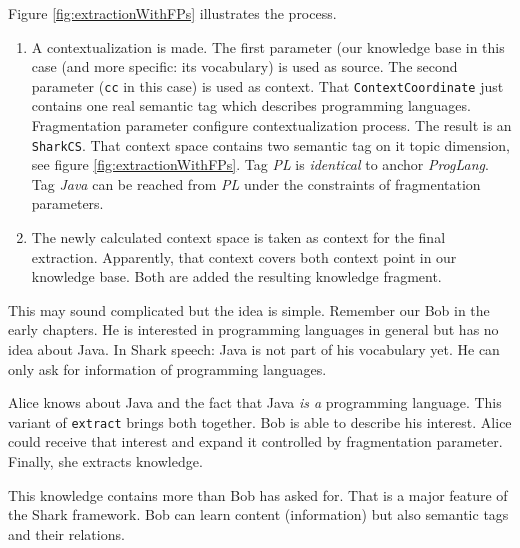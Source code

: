 Figure \ref{fig:extractionWithFPs} illustrates the process.

\begin{enumerate}
\item A contextualization is made. The first parameter (our knowledge base in this case (and more specific: its vocabulary) is used as source. The second parameter ({\tt cc} in this case) is used as context. That {\tt ContextCoordinate} just contains one real semantic tag which describes programming languages. Fragmentation parameter configure contextualization process. The result is an {\tt SharkCS}. That context space contains two semantic tag on it topic dimension, see figure \ref{fig:extractionWithFPs}. Tag {\it PL} is {\it identical} to anchor {\it ProgLang}. Tag {\it Java} can be reached from {\it PL} under the constraints of fragmentation parameters.

\item The newly calculated context space is taken as context for the final extraction. Apparently, that context covers both context point in our knowledge base. Both are added the resulting knowledge fragment.
\end{enumerate}

This may sound complicated but the idea is simple. Remember our Bob in the early chapters. He is interested in programming languages in general but has no idea about Java. In Shark speech: Java is not part of his vocabulary yet. He can only ask for information of programming languages.

Alice knows about Java and the fact that Java {\it is a} programming language. This variant of {\tt extract} brings both together. Bob is able to describe his interest. Alice could receive that interest and expand it controlled by fragmentation parameter. Finally, she extracts knowledge.

This knowledge contains more than Bob has asked for. That is a major feature of the Shark framework. Bob can learn content (information) but also semantic tags and their relations.

